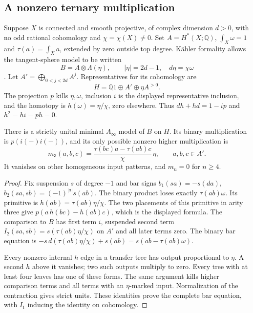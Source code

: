 \subsection{A nonzero ternary multiplication}

Suppose $X$ is connected and smooth projective, of
complex dimension $d>0$, with no odd rational cohomology
and $\chi=\chi(X)\ne0$. Set $A=H^*(X;\mathbb Q)$,
$\int_X\omega=1$ and $\tau(a)=\int_Xa$, extended by
zero outside top degree. K\"ahler formality allows the
tangent-sphere model to be written
\[
 B=A\otimes\Lambda(\eta),
 \qquad |\eta|=2d-1,\quad d\eta=\chi\omega
\]
\cite[\S~6]{rewriteDGMS1975}. Let
$A'=\bigoplus_{0<j<2d}A^j$. Representatives for its
cohomology are
\[
 H=\mathbb Q1\oplus A'\oplus\eta A^{>0}.
\]
The projection $p$ kills $\eta,\omega$, inclusion $i$
is the displayed representative inclusion, and the
homotopy is $h(\omega)=\eta/\chi$, zero elsewhere.
Thus $dh+hd=1-ip$ and $h^2=hi=ph=0$.

\begin{proposition}\label{cyprim:prop:ternary-fibre}
There is a strictly unital minimal $A_\infty$ model
of $B$ on $H$. Its binary multiplication is $p(i(-)i(-))$,
and its only possible nonzero higher multiplication is
\begin{equation}\label{cyprim:eq:ternary-fibre}
 m_3(a,b,c)=\frac{\tau(bc)a-\tau(ab)c}{\chi}\,\eta,
 \qquad a,b,c\in A'.
\end{equation}
It vanishes on other homogeneous input patterns, and
$m_n=0$ for $n\ge4$.
\end{proposition}

\begin{proof}
Fix suspension $s$ of degree $-1$ and bar signs
$b_1(sa)=-s(da)$,
$b_2(sa,sb)=(-1)^{|a|}s(ab)$.
The binary product loses exactly $\tau(ab)\omega$.
Its primitive is $h(ab)=\tau(ab)\eta/\chi$.
The two placements of this primitive in arity three
give $p(a\,h(bc)-h(ab)c)$, which is the displayed formula.
The comparison to $B$ has first term $i$, suspended
second term $I_2(sa,sb)=s(\tau(ab)\eta/\chi)$ on $A'$
and all later terms zero. The binary bar equation is
$-s\,d(\tau(ab)\eta/\chi)+s(ab)=s(ab-\tau(ab)\omega)$.

Every nonzero internal $h$ edge in a transfer tree has
output proportional to $\eta$. A second $h$ above it
vanishes; two such outputs multiply to zero. Every
tree with at least four leaves has one of these forms.
The same argument kills higher comparison terms and
all terms with an $\eta$-marked input. Normalization
of the contraction gives strict units. These identities
prove the complete bar equation, with $I_1$ inducing
the identity on cohomology.
\end{proof}

